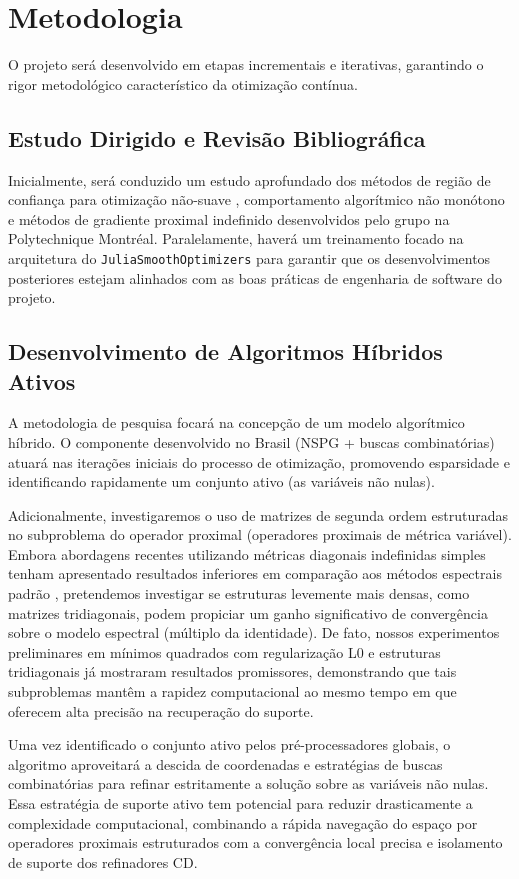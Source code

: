 \section{Metodologia}

O projeto será desenvolvido em etapas incrementais e iterativas, garantindo o rigor metodológico característico da otimização contínua.

\subsection{Estudo Dirigido e Revisão Bibliográfica}
Inicialmente, será conduzido um estudo aprofundado dos métodos de região de confiança para otimização não-suave \cite{leconte2023complexity}, comportamento algorítmico não monótono e métodos de gradiente proximal indefinido \cite{Leconte_2024} desenvolvidos pelo grupo na Polytechnique Montréal. Paralelamente, haverá um treinamento focado na arquitetura do \texttt{JuliaSmoothOptimizers} para garantir que os desenvolvimentos posteriores estejam alinhados com as boas práticas de engenharia de software do projeto.

\subsection{Desenvolvimento de Algoritmos Híbridos Ativos}
A metodologia de pesquisa focará na concepção de um modelo algorítmico híbrido. O componente desenvolvido no Brasil (NSPG + buscas combinatórias) atuará nas iterações iniciais do processo de otimização, promovendo esparsidade e identificando rapidamente um conjunto ativo (as variáveis não nulas). 

Adicionalmente, investigaremos o uso de matrizes de segunda ordem estruturadas no subproblema do operador proximal (operadores proximais de métrica variável). Embora abordagens recentes utilizando métricas diagonais indefinidas simples tenham apresentado resultados inferiores em comparação aos métodos espectrais padrão \cite{Leconte_2024}, pretendemos investigar se estruturas levemente mais densas, como matrizes tridiagonais, podem propiciar um ganho significativo de convergência sobre o modelo espectral (múltiplo da identidade). De fato, nossos experimentos preliminares em mínimos quadrados com regularização L0 e estruturas tridiagonais já mostraram resultados promissores, demonstrando que tais subproblemas mantêm a rapidez computacional ao mesmo tempo em que oferecem alta precisão na recuperação do suporte.

Uma vez identificado o conjunto ativo pelos pré-processadores globais, o algoritmo aproveitará a descida de coordenadas e estratégias de buscas combinatórias para refinar estritamente a solução sobre as variáveis não nulas. Essa estratégia de suporte ativo tem potencial para reduzir drasticamente a complexidade computacional, combinando a rápida navegação do espaço por operadores proximais estruturados com a convergência local precisa e isolamento de suporte dos refinadores CD.

